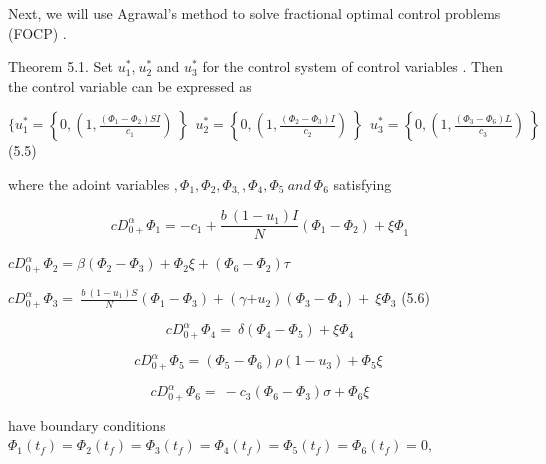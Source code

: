 \documentclass[10pt]{NSP1}
\begin{document}
Next, we will use Agrawal’s method to solve fractional optimal control problems (FOCP) \cite{ref38}.

Theorem 5.1. Set $u_{1}^{\ast}$,$\ u_{2}^{\ast}$ and $u_{3}^{\ast}$ for the control system of control variables . Then the control variable can be expressed as

$\{ u_{1}^{\ast} = \left\{ 0,\left( 1,\frac{\left( \Phi_{1} - \Phi_{2} \right)SI}{c_{1}} \right)\  \right\}\ \ u_{2}^{\ast} = \left\{ 0,\left( 1,\frac{\left( \Phi_{2} - \Phi_{3} \right)I}{c_{2}} \right)\  \right\}\ \ u_{3}^{\ast} = \left\{ 0,\left( 1,\frac{\left( \Phi_{3} - \Phi_{6} \right)L}{c_{3}} \right)\  \right\}\ \ $ (5.5)

where the adoint variables $,\Phi_{1},\Phi_{2},\Phi_{3,},\Phi_{4},\Phi_{5}\ and\ \Phi_{6}$ satisfying

\begin{equation}
{cD}_{0 +}^{\alpha}\Phi_{1} = {- c}_{1} + \frac{b\ \left( 1 - u_{1} \right)I}{N}\left( \Phi_{1} - \Phi_{2} \right) + {\xi\Phi}_{1}

\end{equation}

${cD}_{0 +}^{\alpha}\Phi_{2} = \beta\left( \Phi_{2} - \Phi_{3} \right) + \Phi_{2}\xi + (\Phi_{6} - \Phi_{2})\tau$

${cD}_{0 +}^{\alpha}\Phi_{3} = \ \frac{b\ \left( 1 - u_{1} \right)S}{N}\left( \Phi_{1} - \Phi_{3} \right) + (\gamma{+ u}_{2})\left( \Phi_{3} - \Phi_{4} \right) + \ \xi\Phi_{3}$ (5.6)

\begin{equation}
{cD}_{0 +}^{\alpha}\Phi_{4} = \ \delta\left( \Phi_{4} - \Phi_{5} \right) + \xi\Phi_{4}

\end{equation}

\begin{equation}
{cD}_{0 +}^{\alpha}\Phi_{5} = \left( \Phi_{5} - \Phi_{6} \right)\rho\left( 1 - u_{3} \right) + \Phi_{5}\xi\ 

\end{equation}

\begin{equation}
{cD}_{0 +}^{\alpha}\Phi_{6} = \  - c_{3}\left( \Phi_{6} - \Phi_{3} \right)\sigma + \Phi_{6}\xi

\end{equation}

have boundary conditions $\Phi_{1}\left( t_{f} \right) = \Phi_{2}\left( t_{f} \right) = \Phi_{3}\left( t_{f} \right) = \Phi_{4}\left( t_{f} \right) = \Phi_{5}\left( t_{f} \right) = \Phi_{6}\left( t_{f} \right) = 0,$
\end{document}
